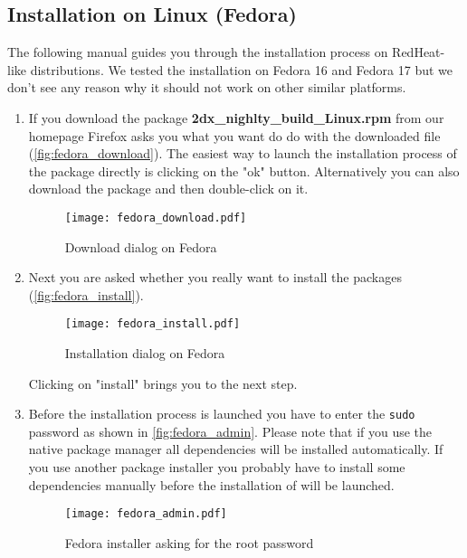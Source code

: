 \subsection{Installation on Linux (Fedora)}
\label{sec:install_rpm}
The following manual guides you through the installation process on RedHeat-like distributions. We tested the installation on Fedora 16 and Fedora 17 but we don't see any reason why it should not work on other similar platforms. 

\begin{enumerate}
	\item If you download the package \textbf{2dx\_nighlty\_build\_Linux.rpm} from our homepage Firefox asks you what you want do do with the downloaded file (\autoref{fig:fedora_download}). The easiest way to launch the installation process of the package directly is clicking on the "ok" button. Alternatively you can also download the package and then double-click on it.
	
	\begin{figure}[H]
		\centering
		\texttt{[image: fedora\_download.pdf]}
		\caption{Download dialog on Fedora}
		\label{fig:fedora_download}
	\end{figure}
	
	\item Next you are asked whether you really want to install the packages (\autoref{fig:fedora_install}). 
	
	\begin{figure}[H]
		\centering
		\texttt{[image: fedora\_install.pdf]}
		\caption{Installation dialog on Fedora}
		\label{fig:fedora_install}
	\end{figure}
	
	Clicking on "install" brings you to the next step.
	
	\item Before the installation process is launched you have to enter the \texttt{sudo} password as shown in \autoref{fig:fedora_admin}. Please note that if you use the native package manager all dependencies will be installed automatically. If you use another package installer you probably have to install some dependencies manually before the installation of {\twodx} will be launched.
	
	\begin{figure}[H]
		\centering
		\texttt{[image: fedora\_admin.pdf]}
		\caption{Fedora installer asking for the root password}
		\label{fig:fedora_admin}
	\end{figure}
	

\end{enumerate}
